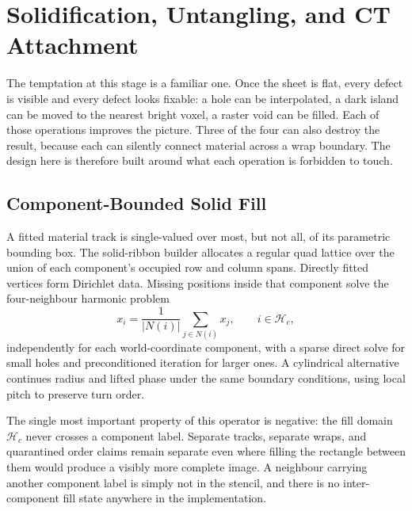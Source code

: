 \section{Solidification, Untangling, and CT Attachment}
\label{sec:finishing}


The temptation at this stage is a familiar one. Once the sheet is flat, every defect is visible and every defect looks fixable: a hole can be interpolated, a dark island can be moved to the nearest bright voxel, a raster void can be filled. Each of those operations improves the picture. Three of the four can also destroy the result, because each can silently connect material across a wrap boundary. The design here is therefore built around what each operation is forbidden to touch.

\subsection{Component-Bounded Solid Fill}
\label{sec:solidfill}

A fitted material track is single-valued over most, but not all, of its parametric bounding box. The solid-ribbon builder allocates a regular quad lattice over the union of each component's occupied row and column spans. Directly fitted vertices form Dirichlet data. Missing positions inside that component solve the four-neighbour harmonic problem
\begin{equation*}
  x_i = \frac{1}{|N(i)|}\sum_{j\in N(i)} x_j,
  \qquad i\in\mathcal H_c,
\end{equation*}
independently for each world-coordinate component, with a sparse direct solve for small holes and preconditioned iteration for larger ones. A cylindrical alternative continues radius and lifted phase under the same boundary conditions, using local pitch to preserve turn order.

The single most important property of this operator is negative: the fill domain $\mathcal H_c$ never crosses a component label. Separate tracks, separate wraps, and quarantined order claims remain separate even where filling the rectangle between them would produce a visibly more complete image. A neighbour carrying another component label is simply not in the stencil, and there is no inter-component fill state anywhere in the implementation.


